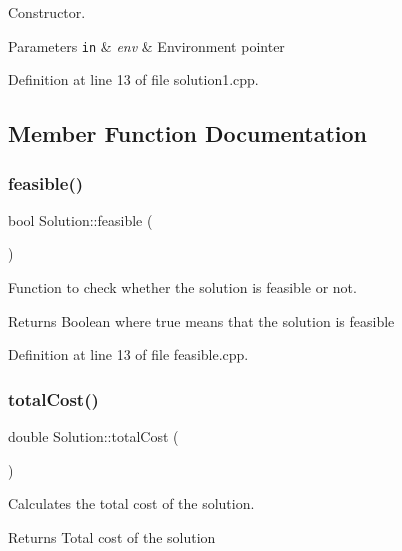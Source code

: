 Constructor. 


\begin{DoxyParams}[1]{Parameters}
\mbox{\tt in}  & {\em env} & Environment pointer \\
\hline
\end{DoxyParams}


Definition at line 13 of file solution1.\+cpp.



\subsection{Member Function Documentation}
\mbox{\label{class_solution_a13e4ebdccdbc8c572a82fb21254022d0}} 
\subsubsection{\texorpdfstring{feasible()}{feasible()}}
{\footnotesize\ttfamily bool Solution\+::feasible (\begin{DoxyParamCaption}{ }\end{DoxyParamCaption})}



Function to check whether the solution is feasible or not. 

\begin{DoxyReturn}{Returns}
Boolean where true means that the solution is feasible 
\end{DoxyReturn}


Definition at line 13 of file feasible.\+cpp.

\mbox{\label{class_solution_a227aaabdf34fbd2e01283728a5a344fe}} 
\subsubsection{\texorpdfstring{total\+Cost()}{totalCost()}}
{\footnotesize\ttfamily double Solution\+::total\+Cost (\begin{DoxyParamCaption}{ }\end{DoxyParamCaption})}



Calculates the total cost of the solution. 

\begin{DoxyReturn}{Returns}
Total cost of the solution 
\end{DoxyReturn}



